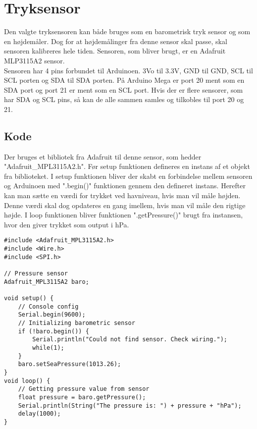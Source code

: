 \section{Tryksensor}
	Den valgte tryksensoren kan både bruges som en barometrisk tryk sensor og som en højdemåler. Dog for at højdemålinger fra denne sensor skal passe, skal sensoren kalibreres hele tiden. Sensoren, som bliver brugt, er en Adafruit MLP3115A2 sensor. \\ [7pt]
	Sensoren har 4 pins forbundet til Arduinoen. 3Vo til 3.3V, GND til GND, SCL til SCL porten og SDA til SDA porten. På Arduino Mega er port 20 ment som en SDA port og port 21 er ment som en SCL port. Hvis der er flere sensorer, som har SDA og SCL pins, så kan de alle sammen samles og tilkobles til port 20 og 21.
	\subsection{Kode}
		Der bruges et bibliotek fra Adafruit til denne sensor, som hedder "Adafruit\_MPL3115A2.h". Før setup funktionen defineres en instans af et objekt fra biblioteket. I setup funktionen bliver der skabt en forbindelse mellem sensoren og Arduinoen med ".begin()"{} funktionen gennem den defineret instans. Herefter kan man sætte en værdi for trykket ved havniveau, hvis man vil måle højden. Denne værdi skal dog opdateres en gang imellem, hvis man vil måle den rigtige højde. I loop funktionen bliver funktionen ".getPressure()"{} brugt fra instansen, hvor den giver trykket som output i hPa.
		\begin{lstlisting}
#include <Adafruit_MPL3115A2.h>
#include <Wire.h>
#include <SPI.h>

// Pressure sensor
Adafruit_MPL3115A2 baro;

void setup() {
	// Console config
	Serial.begin(9600);
	// Initializing barometric sensor
	if (!baro.begin()) {
		Serial.println("Could not find sensor. Check wiring.");
		while(1);
	}
	baro.setSeaPressure(1013.26);
}
void loop() {
	// Getting pressure value from sensor
	float pressure = baro.getPressure();
	Serial.println(String("The pressure is: ") + pressure + "hPa");
	delay(1000);
}
		\end{lstlisting}